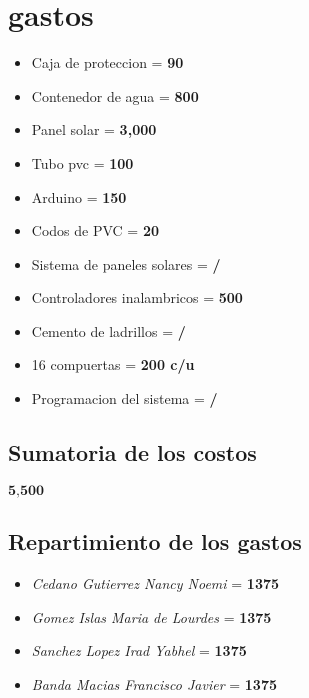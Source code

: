 \documentclass[11pt,a4paper]{article}
\begin{document}
\section{gastos}
\begin{itemize}
\item  Caja  de  proteccion = \textbf{90}
\item  Contenedor de agua = \textbf{800 }
\item  Panel solar = \textbf{3,000}
\item  Tubo pvc = \textbf{100} 
\item  Arduino = \textbf{150} 
\item  Codos de PVC = \textbf{20} 
\item  Sistema de paneles solares = \textbf{/} 
\item  Controladores inalambricos = \textbf{500} 
\item  Cemento de ladrillos = \textbf{ / }
\item  16 compuertas = \textbf{200 c/u }
\item  Programacion del sistema = \textbf{/} 
\end{itemize}

\subsection{Sumatoria de los costos }
$ \textbf{5,500} $

\subsection{Repartimiento de los gastos}
\begin{itemize}
\item \emph{Cedano Gutierrez Nancy Noemi} = \textbf{1375}
\item \emph{Gomez Islas Maria de Lourdes} = \textbf{1375}
\item \emph{Sanchez Lopez Irad Yabhel} = \textbf{1375}
\item \emph{Banda Macias Francisco Javier} = \textbf{1375}
\end{itemize}
\end{document}
